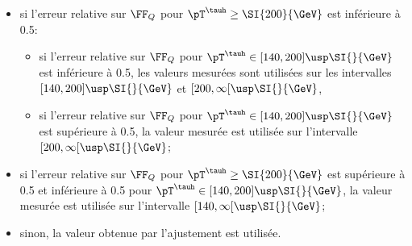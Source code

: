 \begin{itemize}
\item si l'erreur relative sur $\FF_Q$ pour $\pT^{\tauh}\geq\SI{200}{\GeV}$ est inférieure à \num{0.5}:
\begin{itemize}
\item si l'erreur relative sur $\FF_Q$ pour $\pT^{\tauh}\in[140, 200]\usp\SI{}{\GeV}$ est inférieure à \num{0.5}, les valeurs mesurées sont utilisées sur les intervalles $[140, 200]\usp\SI{}{\GeV}$ et $[200, \infty[\usp\SI{}{\GeV}$,
\item si l'erreur relative sur $\FF_Q$ pour $\pT^{\tauh}\in[140, 200]\usp\SI{}{\GeV}$ est supérieure à \num{0.5}, la valeur mesurée est utilisée sur l'intervalle $[200, \infty[\usp\SI{}{\GeV}$;
\end{itemize}
\item si l'erreur relative sur $\FF_Q$ pour $\pT^{\tauh}\geq\SI{200}{\GeV}$ est supérieure à \num{0.5}
et inférieure à \num{0.5} pour $\pT^{\tauh}\in[140, 200]\usp\SI{}{\GeV}$,
la valeur mesurée est utilisée sur l'intervalle $[140, \infty[\usp\SI{}{\GeV}$;
\item sinon, la valeur obtenue par l'ajustement est utilisée.
\end{itemize}
